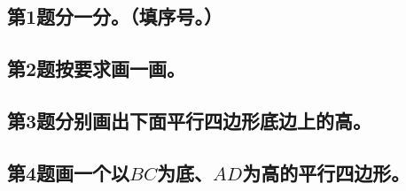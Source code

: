 \subsection*{第1题\quad 分一分。（填序号。）}
\subsection*{第2题\quad 按要求画一画。}
\subsection*{第3题\quad 分别画出下面平行四边形底边上的高。}
\subsection*{第4题\quad 画一个以$BC$为底、$AD$为高的平行四边形。}
